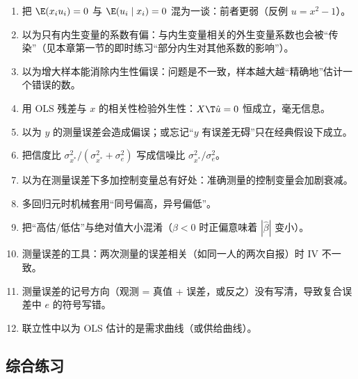 \begin{enumerate}
  \item 把 $\E(x_iu_i)=0$ 与 $\E(u_i\mid x_i)=0$ 混为一谈：前者更弱（反例 $u=x^2-1$）。
  \item 以为只有内生变量的系数有偏：与内生变量相关的外生变量系数也会被“传染”（见本章第一节的即时练习“部分内生对其他系数的影响”）。
  \item 以为增大样本能消除内生性偏误：问题是不一致，样本越大越“精确地”估计一个错误的数。
  \item 用 OLS 残差与 $x$ 的相关性检验外生性：$X\T\hat u=0$ 恒成立，毫无信息。
  \item 以为 $y$ 的测量误差会造成偏误；或忘记“$y$ 有误差无碍”只在经典假设下成立。
  \item 把信度比 $\sigma_{x^*}^2/(\sigma_{x^*}^2+\sigma_e^2)$ 写成信噪比 $\sigma_{x^*}^2/\sigma_e^2$。
  \item 以为在测量误差下多加控制变量总有好处：准确测量的控制变量会加剧衰减。
  \item 多回归元时机械套用“同号偏高，异号偏低”。
  \item 把“高估/低估”与绝对值大小混淆（$\beta<0$ 时正偏意味着 $|\hat\beta|$ 变小）。
  \item 测量误差的工具：两次测量的误差相关（如同一人的两次自报）时 IV 不一致。
  \item 测量误差的记号方向（观测 = 真值 + 误差，或反之）没有写清，导致复合误差中 $e$ 的符号写错。
  \item 联立性中以为 OLS 估计的是需求曲线（或供给曲线）。
\end{enumerate}

\subsection{综合练习}

